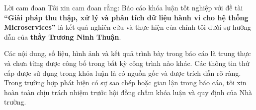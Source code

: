 \documentclass{uetgraduation}
\begin{document}
\begin{preamble}{Lời cam đoan}
Tôi xin cam đoan rằng: 
Báo cáo khóa luận tốt nghiệp với đề tài \textbf{“Giải pháp thu thập, xử lý và phân tích dữ liệu hành vi cho hệ thống Microservices”} 
là kết quả nghiên cứu và thực hiện của chính tôi dưới sự hướng dẫn của \textbf{thầy Trương Ninh Thuận}. 

Các nội dung, số liệu, hình ảnh và kết quả trình bày trong báo cáo 
là trung thực và chưa từng được công bố trong bất kỳ công trình nào khác.
Các thông tin thứ cấp được sử dụng trong khóa luận là có nguồn gốc và được trích dẫn rõ ràng. Trong trường hợp phát hiện có sự sao chép hoặc gian lận trong báo cáo, tôi xin hoàn toàn chịu trách nhiệm trước hội đồng chấm khóa luận và quy định của Nhà trường.

\vspace{3cm}


\end{preamble}
\end{document}
